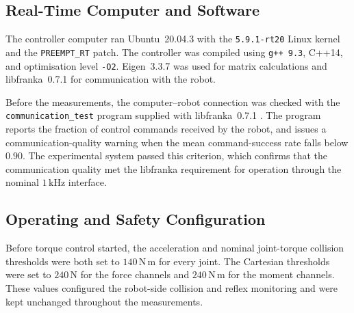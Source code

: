 
\begin{figure}[H]
    \centering
    
    \caption[Experimental system and surface-frame contact geometry]{}
    \label{fig:experimental_setup_photo}
\end{figure}


\subsection{Real-Time Computer and Software}
\label{subsec:experimental_software_computer}

The controller computer ran Ubuntu~20.04.3 with the
\texttt{5.9.1-rt20} Linux kernel and the \texttt{PREEMPT\_RT} patch. The
controller was compiled using \texttt{g++~9.3}, C++14, and optimisation level
\texttt{-O2}. Eigen~3.3.7 was used for matrix calculations and
libfranka~0.7.1 for communication with the robot.

Before the measurements, the computer--robot connection was checked with the
\texttt{communication\_test} program supplied with libfranka~0.7.1
\citep{libfrankaCommunicationTest}. The program reports the fraction of
control commands received by the robot, and issues a communication-quality
warning when the mean command-success rate falls below \(0.90\). The
experimental system passed this criterion, which confirms that the
communication quality met the libfranka requirement for operation through the
nominal \(1\,\mathrm{kHz}\) interface.


\subsection{Operating and Safety Configuration}
\label{subsec:reproducibility_record}
\label{sec:experimental_monitoring_limits}
\label{sec:damping_safety_limits_contact}

Before torque control started, the acceleration and nominal joint-torque
collision thresholds were both set to \(140\,\mathrm{N\,m}\) for every
joint. The Cartesian thresholds were set to \(240\,\mathrm{N}\) for the
force channels and \(240\,\mathrm{N\,m}\) for the moment channels. These
values configured the robot-side collision and reflex monitoring and were kept
unchanged throughout the measurements.


